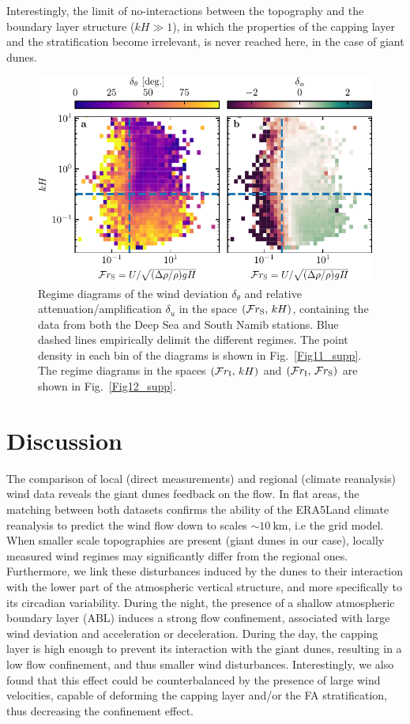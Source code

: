   Interestingly, the limit of no-interactions between the topography and the boundary layer structure ($k H \gg 1$), in which the properties of the capping layer and the stratification become irrelevant, is never reached here, in the case of giant dunes.

  \begin{figure}
    \centering
    \includegraphics[scale=1]{Figures/Figure5.pdf}
    \caption{Regime diagrams of the wind deviation $\delta_{\theta}$ and relative attenuation/amplification $\delta_{u}$ in the space $(\mathcal{F}r_{\textup{S}}, \, kH)$, containing the data from both the Deep Sea and South Namib stations. Blue dashed lines empirically delimit the different regimes. The point density in each bin of the diagrams is shown in Fig.~\ref{Fig11_supp}. The regime diagrams in the spaces $(\mathcal{F}r_{\textup{I}}, \, kH)$ and $(\mathcal{F}r_{\textup{I}}, \, \mathcal{F}r_{\textup{S}})$ are shown in Fig.~\ref{Fig12_supp}.}
    \label{Fig5}
  \end{figure}

\section{Discussion}

 The comparison of local (direct measurements) and regional (climate reanalysis) wind data reveals the giant dunes feedback on the flow. In flat areas, the matching between both datasets confirms the ability of the ERA5Land climate reanalysis to predict the wind flow down to scales $\sim 10~\textrm{km}$, i.e the grid model. When smaller scale topographies are present (giant dunes in our case), locally measured wind regimes may significantly differ from the regional ones. Furthermore, we link these disturbances induced by the dunes to their interaction with the lower part of the atmospheric vertical structure, and more specifically to its circadian variability. During the night, the presence of a shallow atmospheric boundary layer (ABL) induces a strong flow confinement, associated with large wind deviation and acceleration or deceleration. During the day, the capping layer is high enough to prevent its interaction with the giant dunes, resulting in a low flow confinement, and thus smaller wind disturbances. Interestingly, we also found that this effect could be counterbalanced by the presence of large wind velocities, capable of deforming the capping layer and/or the FA stratification, thus decreasing the confinement effect.

